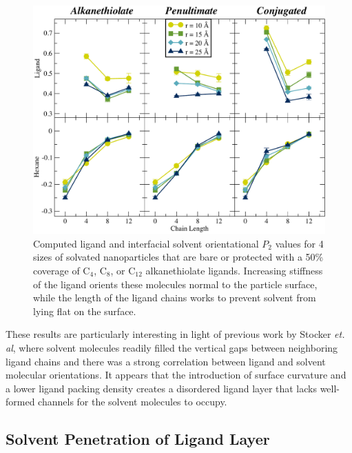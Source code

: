 \begin{figure}
  \includegraphics[width=\linewidth]{figures/P2_3.pdf}
  \caption{Computed ligand and interfacial solvent orientational $P_2$
    values for 4 sizes of solvated nanoparticles that are bare or
    protected with a 50\% coverage of C$_{4}$, C$_{8}$, or C$_{12}$
    alkanethiolate ligands. Increasing stiffness of the ligand orients
    these molecules normal to the particle surface, while the length
    of the ligand chains works to prevent solvent from lying flat on
    the surface.}
  \label{fig:NPthiols_P2}
\end{figure}

These results are particularly interesting in light of previous
work by Stocker \textit{et. al}\cite{Stocker:2013cl}, where solvent molecules readily filled
the vertical gaps between neighboring ligand chains and there was a
strong correlation between ligand and solvent molecular
orientations. It appears that the introduction of surface curvature
and a lower ligand packing density creates a disordered ligand layer
that lacks well-formed channels for the solvent molecules to occupy.

\subsection{Solvent Penetration of Ligand Layer}


